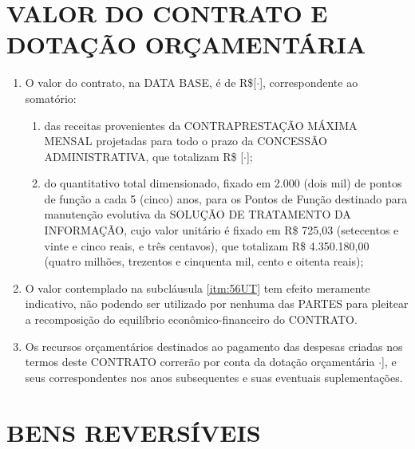\documentclass[a4paper,11pt]{report} %
\newcommand{\ValorContrato}{[$\cdot$]}
\newcommand{\ValorTotalCP}{[$\cdot$]}
\newcommand{\DotacaoOrcamentaria}{$\cdot$]}
\begin{document}
\section{VALOR DO CONTRATO E DOTAÇÃO ORÇAMENTÁRIA}
\label{sec:5GLW}

\begin{enumerate}
\item \label{itm:56UT} O valor do contrato, na DATA BASE, é de R\$\ValorContrato, correspondente ao somatório: 

\begin{enumerate}[label*=\arabic*.]
\item \label{itm:3887}	das receitas provenientes da CONTRAPRESTAÇÃO MÁXIMA MENSAL projetadas para todo o prazo da CONCESSÃO ADMINISTRATIVA, que totalizam R\$ \ValorTotalCP;
\item \label{itm:9XEH}	do quantitativo total dimensionado, fixado em 2.000 (dois mil) de pontos de função a cada 5 (cinco) anos, para os Pontos de Função destinado para manutenção evolutiva da SOLUÇÃO DE TRATAMENTO DA INFORMAÇÃO, cujo valor unitário é fixado em R\$ 725,03 (setecentos e vinte e cinco reais, e três centavos), que totalizam R\$ 4.350.180,00 (quatro milhões, trezentos e cinquenta mil, cento e oitenta reais);
\end{enumerate}

\item \label{itm:7ARJ} O valor contemplado na subcláusula \ref{itm:56UT} tem efeito meramente indicativo, não podendo ser utilizado por nenhuma das PARTES para pleitear a recomposição do equilíbrio econômico-financeiro do CONTRATO.
\item \label{itm:UMZE} Os recursos orçamentários destinados ao pagamento das despesas criadas nos termos deste CONTRATO correrão por conta da dotação orçamentária \DotacaoOrcamentaria, e seus correspondentes nos anos subsequentes e suas eventuais suplementações.
\end{enumerate}

\section{BENS REVERSÍVEIS}
\label{sec:YY42}
\end{document}
